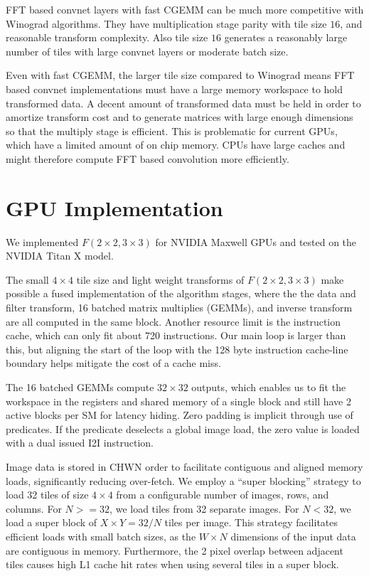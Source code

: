\documentclass[10pt,twocolumn,letterpaper]{article}
\begin{document}
FFT based convnet layers with fast CGEMM can be much more competitive with Winograd algorithms. They have multiplication stage parity with tile size $16$, and reasonable transform complexity. Also tile size $16$ generates a reasonably large number of tiles with large convnet layers or moderate batch size.

Even with fast CGEMM, the larger tile size compared to Winograd means FFT based convnet implementations must have a large memory workspace to hold transformed data. A decent amount of transformed data must be held in order to amortize transform cost and to generate matrices with large enough dimensions so that the multiply stage is efficient. This is problematic for current GPUs, which have a limited amount of on chip memory. CPUs have large caches and might therefore compute FFT based convolution more efficiently.

\section{GPU Implementation}

We implemented $F(2\times 2, 3 \times 3)$ for NVIDIA Maxwell GPUs and tested on the NVIDIA Titan X model. 

The small $4\times 4$ tile size and light weight transforms of $F(2 \times 2, 3 \times 3)$ make possible a fused implementation of the algorithm stages, where the the data and filter transform, 16 batched matrix multiplies (GEMMs), and inverse transform are all computed in the same block. Another resource limit is the instruction cache, which can only fit about 720 instructions. Our main loop is larger than this, but aligning the start of the loop with the 128 byte instruction cache-line boundary helps mitigate the cost of a cache miss.

The 16 batched GEMMs compute $32 \times 32$ outputs, which enables us to fit the workspace in the registers and shared memory of a single block and still have 2 active blocks per SM for latency hiding. Zero padding is implicit through use of predicates. If the predicate deselects a global image load, the zero value is loaded with a dual issued I2I instruction.

Image data is stored in CHWN order to facilitate contiguous and aligned memory loads, significantly reducing over-fetch. We employ a ``super blocking'' strategy to load 32 tiles of size $4 \times 4$ from a configurable number of images, rows, and columns. For $N>=32$, we load tiles from 32 separate images. For $N<32$, we load a super block of $X\times Y=32/N$ tiles per image. This strategy facilitates efficient loads with small batch sizes, as the $W\times N$ dimensions of the input data are contiguous in memory. Furthermore, the 2 pixel overlap between adjacent tiles causes high L1 cache hit rates when using several tiles in a super block. 
\end{document}
